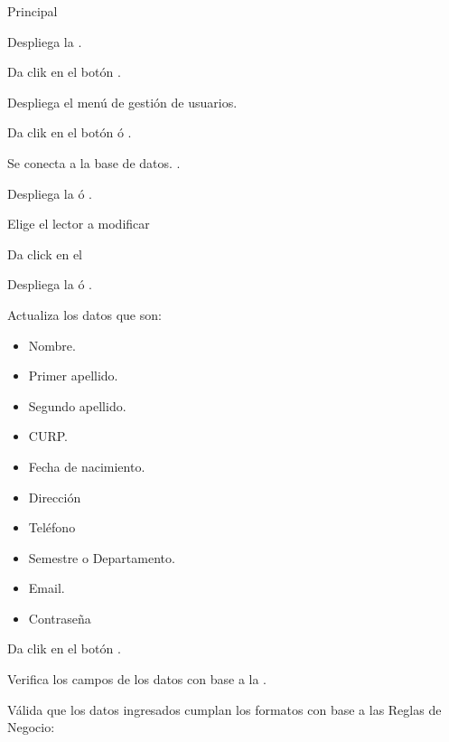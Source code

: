 	
	
	\begin{UCtrayectoria}{Principal}
	
		\UCpaso Despliega la .

		\UCpaso[\UCactor] Da clik en el botón .

		\UCpaso Despliega el menú de gestión de usuarios. 

		\UCpaso[\UCactor] Da clik en el botón  ó .\label{CU4.2ConectarBaseDatos}

		\UCpaso Se conecta a la base de datos. .

		\UCpaso Despliega la  ó .

		\UCpaso[\UCactor] Elige el lector a modificar

		\UCpaso[\UCactor] Da click en el 

		\UCpaso Despliega la  ó .


		\UCpaso[\UCactor] Actualiza los datos que son: 
			\begin{itemize}
				\item Nombre.
				\item Primer apellido.
				\item Segundo apellido.
				\item CURP.
				\item Fecha de nacimiento.
				\item Dirección
				\item Teléfono
				\item Semestre o Departamento.
				\item Email.
				\item Contraseña
			\end{itemize} 
		\label{CU4.1FormularioLector}

		\UCpaso[\UCactor] Da clik en el botón .

		\UCpaso Verifica los campos de los datos con base a la  .

		\UCpaso Válida que los datos ingresados cumplan los formatos con base a las Reglas de Negocio: 
				

\end{UCtrayectoria}
